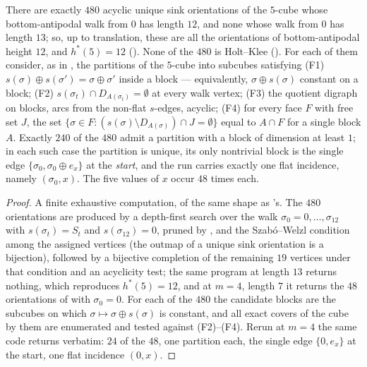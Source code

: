 \begin{lemma}\label{mw:twelve-flat}
There are exactly $480$ acyclic unique sink orientations of the $5$-cube whose
bottom-antipodal walk from $0$ has length $12$, and none whose walk from $0$
has length $13$; so, up to translation, these are all the orientations of
bottom-antipodal height $12$, and $h^{\ast}(5)=12$ ().
None of the $480$ is Holt--Klee (). For each of them
consider, as in , the partitions of the $5$-cube into
subcubes satisfying
(F1) $s(\sigma)\oplus s(\sigma')=\sigma\oplus\sigma'$ inside a block ---
equivalently, $\sigma\oplus s(\sigma)$ constant on a block;
(F2) $s(\sigma_t)\cap D_{A(\sigma_t)}=\emptyset$ at every walk vertex;
(F3) the quotient digraph on blocks, arcs from the non-flat $s$-edges,
acyclic;
(F4) for every face $F$ with free set $J$, the set
$\{\sigma\in F:(s(\sigma)\setminus D_{A(\sigma)})\cap J=\emptyset\}$ equal to
$A\cap F$ for a single block $A$.
Exactly $240$ of the $480$ admit a partition with a block of dimension at
least $1$; in each such case the partition is unique, its only nontrivial
block is the single edge $\{\sigma_0,\sigma_0\oplus e_x\}$ at the
\emph{start}, and the run carries exactly one flat incidence, namely
$(\sigma_0,x)$. The five values of $x$ occur $48$ times each.
\end{lemma}

\begin{proof}
A finite exhaustive computation, of the same shape as
's. The $480$ orientations are produced by a depth-first
search over the walk $\sigma_0=0,\dots,\sigma_{12}$ with $s(\sigma_t)=S_t$
and $s(\sigma_{12})=0$, pruned by ,  and
the Szab\'o--Welzl condition among the assigned vertices (the outmap of a
unique sink orientation is a bijection), followed by a bijective completion
of the remaining $19$ vertices under that condition and an acyclicity test;
the same program at length $13$ returns nothing, which reproduces
$h^{\ast}(5)=12$, and at $m=4$, length $7$ it returns the $48$ orientations
of  with $\sigma_0=0$. For each of the $480$ the
candidate blocks are the subcubes on which
$\sigma\mapsto\sigma\oplus s(\sigma)$ is constant, and all exact covers of
the cube by them are enumerated and tested against (F2)--(F4). Rerun at $m=4$
the same code returns  verbatim: $24$ of the $48$, one
partition each, the single edge $\{0,e_x\}$ at the start, one flat incidence
$(0,x)$.
\end{proof}

